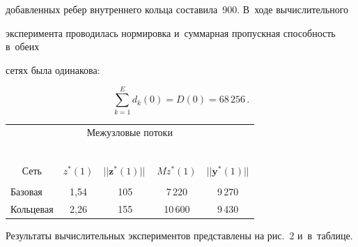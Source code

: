 добавленных ребер внутреннего кольца составила~900. В~ходе вы\-чис\-ли\-тель\-но\-го 


эксперимента проводилась нормировка и~суммарная пропускная спо\-соб\-ность в~обеих 


сетях была одинакова:


$$


 \sum\limits_{k=1}^{E} d_k(0) = D(0)= 68\,256\,.


 $$


 


 \begin{table}


{\small


\begin{center}


\begin{tabular}{|l|c|c|c|c|}


\multicolumn{5}{c}{Межузловые потоки}\\


\multicolumn{5}{c}{\ }\\[-6pt]


\hline


&&&&\\[-9pt]


    \multicolumn{1}{|c|}{Сеть} & $z^*(1)$ & $||\mathbf{z}^*(1)||\ $ &  $M z^*(1)$ &  $||\mathbf{y}^*(1)|| $  \\


    &&&&\\[-9pt]


    \hline


    Базовая &  1,54 &  105 & \hphantom{9}7\,220 & 9\,270 \\




    Кольцевая &  2,26 &  155 & 10\,600 & 9\,430 \\


    \hline


\end{tabular}


\end{center}}


\end{table}










Результаты вычислительных экспериментов представлены на рис.~2 и~в~таб\-ли\-це. 


